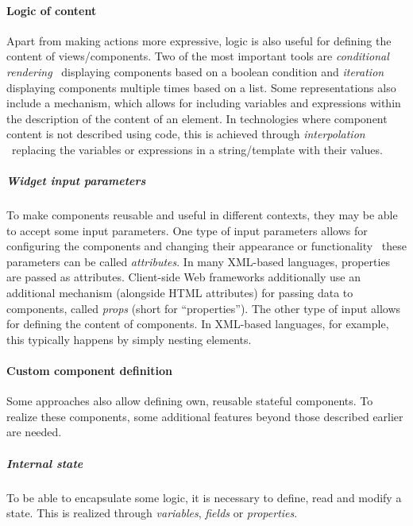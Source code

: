 \paragraph{Logic of content}
Apart from making actions more expressive, logic is also useful for defining the content of views/components.
Two of the most important tools are \emph{conditional rendering} \textendash\ displaying components based on a boolean condition and \emph{iteration} displaying components multiple times based on a list.
Some representations also include a mechanism, which allows for including variables and expressions within the description of the content of an element.
In technologies where component content is not described using code, this is achieved through \emph{interpolation} \textendash\ replacing the variables or expressions in a string/template with their values.

\subparagraph{Widget input parameters}
To make components reusable and useful in different contexts, they may be able to accept some input parameters.
One type of input parameters allows for configuring the components and changing their appearance or functionality \textendash\ these parameters can be called \emph{attributes}.
In many XML-based languages, properties are passed as attributes.
Client-side Web frameworks additionally use an additional mechanism (alongside HTML attributes) for passing data to components, called \emph{props} (short for \enquote{properties}).
The other type of input allows for defining the content of components.
In XML-based languages, for example, this typically happens by simply nesting elements.

\paragraph{Custom component definition}
Some approaches also allow defining own, reusable stateful components.
To realize these components, some additional features beyond those described earlier are needed.

\subparagraph{Internal state}
To be able to encapsulate some logic, it is necessary to define, read and modify a state.
This is realized through \emph{variables}, \emph{fields} or \emph{properties}.

